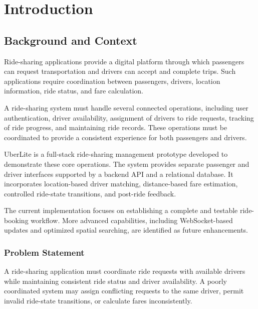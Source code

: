 \documentclass{tietreport}
\author{%
  \texttt{1024030740} Ayush\\
  \texttt{1024030749} Anshika\\
  \texttt{1024030325} Gurleen Kaur%
}
\begin{document}
\raggedbottom

\maketitle
\tableofcontents


\chapter{Introduction}

\section{Background and Context}

Ride-sharing applications provide a digital platform through which
passengers can request transportation and drivers can accept and
complete trips. Such applications require coordination between
passengers, drivers, location information, ride status, and fare
calculation.

A ride-sharing system must handle several connected operations,
including user authentication, driver availability, assignment of
drivers to ride requests, tracking of ride progress, and maintaining
ride records. These operations must be coordinated to provide a
consistent experience for both passengers and drivers.

UberLite is a full-stack ride-sharing management prototype developed
to demonstrate these core operations. The system provides separate
passenger and driver interfaces supported by a backend API and a
relational database. It incorporates location-based driver matching,
distance-based fare estimation, controlled ride-state transitions,
and post-ride feedback.

The current implementation focuses on establishing a complete and
testable ride-booking workflow. More advanced capabilities, including
WebSocket-based updates and optimized spatial searching, are
identified as future enhancements.

\subsection{Problem Statement}

A ride-sharing application must coordinate ride requests with
available drivers while maintaining consistent ride status and driver
availability. A poorly coordinated system may assign conflicting
requests to the same driver, permit invalid ride-state transitions,
or calculate fares inconsistently.
\end{document}
